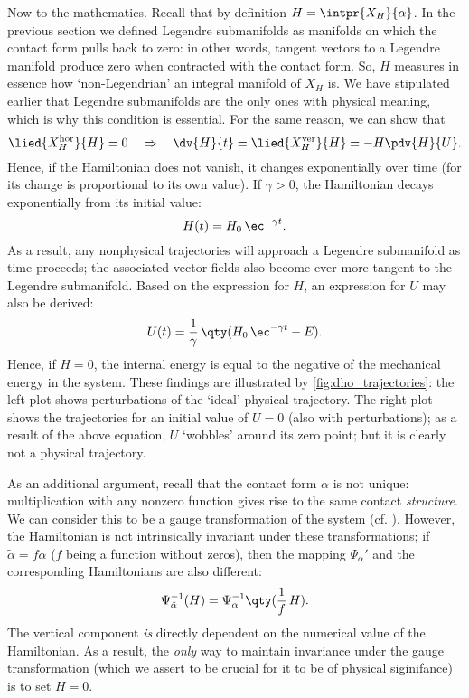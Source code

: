 Now to the mathematics. Recall that by definition $H = \intpr{X_H}{\alpha}$. In the previous section we defined Legendre submanifolds as manifolds on which the contact form pulls back to zero: in other words, tangent vectors to a Legendre manifold produce zero when contracted with the contact form. So, $H$ measures in essence how `non-Legendrian' an integral manifold of $X_H$ is. We have stipulated earlier that Legendre submanifolds are the only ones with physical meaning, which is why this condition is essential. For the same reason, we can show that
$$ \lied{X^{\text{hor}}_H}{H} = 0 \quad \Rightarrow \quad \dv{H}{t} = \lied{X^{\text{ver}}_H}{H} = -H\pdv{H}{U}. $$
Hence, if the Hamiltonian does not vanish, it changes exponentially over time (for its change is proportional to its own value). If $\gamma > 0$, the Hamiltonian decays exponentially from its initial value:
$$ H(t) = H_0\,\ec^{-\gamma t}.$$
As a result, any nonphysical trajectories will approach a Legendre submanifold as time proceeds; the associated vector fields also become ever more tangent to the Legendre submanifold. Based on the expression for $H$, an expression for $U$ may also be derived:
$$ U(t) = \frac{1}{\gamma}\,\qty( H_0\,\ec^{-\gamma t} - E ). $$
Hence, if $H = 0$, the internal energy is equal to the negative of the mechanical energy in the system. These findings are illustrated by \cref{fig:dho_trajectories}: the left plot shows perturbations of the `ideal' physical trajectory. The right plot shows the trajectories for an initial value of $U = 0$ (also with perturbations); as a result of the above equation, $U$ `wobbles' around its zero point; but it is clearly not a physical trajectory.

As an additional argument, recall that the contact form $\alpha$ is not unique: multiplication with any nonzero function gives rise to the same contact \emph{structure}. We can consider this to be a gauge transformation of the system (cf. \citet{Balian2001}). However, the Hamiltonian is not intrinsically invariant under these transformations; if $ \tilde{\alpha} = f \alpha $ ($f$ being a function without zeros), then the mapping $\Psi_\alpha'$ and the corresponding Hamiltonians are also different: \cite[p. 321]{Libermann1987} 
\begin{equation}
    \Psi^{-1}_{\tilde{\alpha}}(H) = \Psi^{-1}_{\alpha}\qty(\frac{1}{f}\,H).
    \label{eq:contact_ham_scaling}
\end{equation}
The vertical component \emph{is} directly dependent on the numerical value of the Hamiltonian. As a result, the \emph{only} way to maintain invariance under the gauge transformation (which we assert to be crucial for it to be of physical siginifance) is to set $H = 0$.

